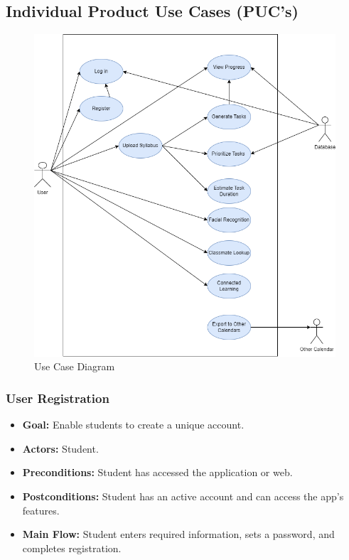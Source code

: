 \documentclass[12pt]{article}
\begin{document}
\subsection{Individual Product Use Cases (PUC’s)}
\begin{figure}[htbp]
    \centering
    \includegraphics[width=1.0\linewidth]{Use Case Diagram.drawio.png} 
    \caption{Use Case Diagram}
\end{figure}

\subsubsection{User Registration}
\begin{itemize}
    \item \textbf{Goal:} Enable students to create a unique account.
    \item \textbf{Actors:} Student.
    \item \textbf{Preconditions:} Student has accessed the application or web.
    \item \textbf{Postconditions:} Student has an active account and can access the app's features.
    \item \textbf{Main Flow:} Student enters required information, sets a password, and completes registration.
\end{itemize}
\end{document}
